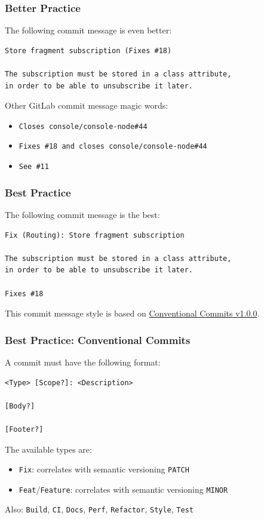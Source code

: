 \documentclass[10pt, compress]{beamer}
\begin{document}
\begin{frame}[fragile]
  \frametitle{Better Practice}
  
  The following commit message is even better:
  \begin{verbatim}
Store fragment subscription (Fixes #18)

The subscription must be stored in a class attribute,
in order to be able to unsubscribe it later.
  \end{verbatim}
  
  Other GitLab commit message magic words:
  \begin{itemize}
      \item \texttt{Closes console/console-node\#44}
      \item \texttt{Fixes \#18 and closes console/console-node\#44}
      \item \texttt{See \#11}
  \end{itemize}

\end{frame}

\begin{frame}[fragile]
  \frametitle{Best Practice}
  
  The following commit message is the best:
  \begin{verbatim}
Fix (Routing): Store fragment subscription

The subscription must be stored in a class attribute,
in order to be able to unsubscribe it later.

Fixes #18
  \end{verbatim}
  
  This commit message style is based on \href{https://www.conventionalcommits.org/en/v1.0.0/}{Conventional Commits v1.0.0}.

\end{frame}

\begin{frame}[fragile]
  \frametitle{Best Practice: Conventional Commits}
  
  A commit must have the following format:
  \begin{verbatim}
<Type> [Scope?]: <Description>

[Body?]

[Footer?]
  \end{verbatim}
  
  The available types are:
  \begin{itemize}
      \item \texttt{Fix}: correlates with semantic versioning \texttt{PATCH}
      \item \texttt{Feat}/\texttt{Feature}: correlates with semantic versioning \texttt{MINOR}
  \end{itemize}
  Also: \texttt{Build}, \texttt{CI}, \texttt{Docs}, \texttt{Perf}, \texttt{Refactor}, \texttt{Style}, \texttt{Test}

\end{frame}
\end{document}
